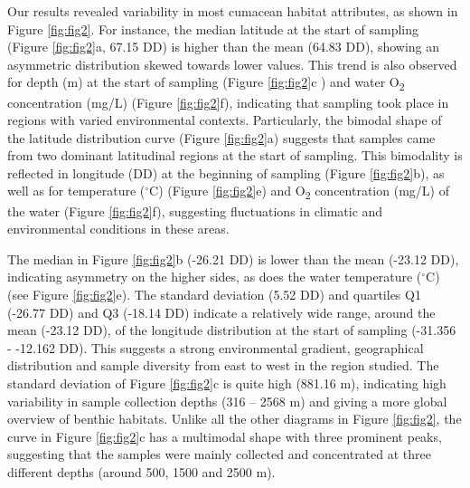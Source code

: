 Our results revealed variability in most cumacean habitat attributes, as shown in Figure \ref{fig:fig2}. For instance, the median latitude at the start of sampling (Figure \ref{fig:fig2}a, 67.15 DD) is higher than the mean (64.83 DD), showing an asymmetric distribution skewed towards lower values. This trend is also observed for depth (m) at the start of sampling (Figure \ref{fig:fig2}c ) and water O\textsubscript{2} concentration (mg/L) (Figure \ref{fig:fig2}f), indicating that sampling took place in regions with varied environmental contexts. Particularly, the bimodal shape of the latitude distribution curve (Figure \ref{fig:fig2}a) suggests that samples came from two dominant latitudinal regions at the start of sampling. This bimodality is reflected in longitude (DD) at the beginning of sampling (Figure \ref{fig:fig2}b), as well as for temperature ($^\circ$C) (Figure \ref{fig:fig2}e) and O\textsubscript{2} concentration (mg/L) of the water (Figure \ref{fig:fig2}f), suggesting fluctuations in climatic and environmental conditions in these areas.  

The median in Figure \ref{fig:fig2}b (-26.21 DD) is lower than the mean (-23.12 DD), indicating asymmetry on the higher sides, as does the water temperature ($^\circ$C) (see Figure \ref{fig:fig2}e). The standard deviation (5.52 DD) and quartiles Q1 (-26.77 DD) and Q3 (-18.14 DD) indicate a relatively wide range, around the mean (-23.12 DD), of the longitude distribution at the start of sampling (-31.356 - -12.162 DD). This suggests a strong environmental gradient, geographical distribution and sample diversity from east to west in the region studied. The standard deviation of Figure \ref{fig:fig2}c is quite high (881.16 m), indicating high variability in sample collection depths (316 – 2568 m) and giving a more global overview of benthic habitats. Unlike all the other diagrams in Figure \ref{fig:fig2}, the curve in Figure \ref{fig:fig2}c has a multimodal shape with three prominent peaks, suggesting that the samples were mainly collected and concentrated at three different depths (around 500, 1500 and 2500 m).

